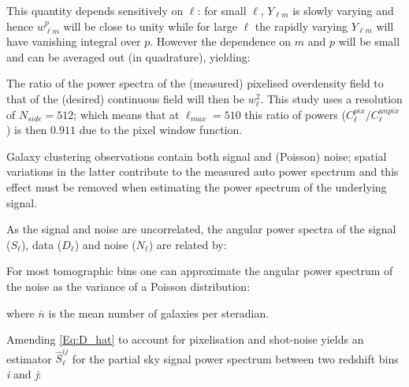 
\noindent This quantity depends sensitively on $\ell$: for small $\ell$, $Y_{\ell m}$ is slowly varying and hence $w_{\ell m}^p$ will be close to unity while for large $\ell$ the rapidly varying $Y_{\ell m}$ will have vanishing integral over $p$. However the dependence on $m$ and $p$ will be small and can be averaged out (in quadrature), yielding:


\noindent The ratio of the power spectra of the (measured) pixelised overdensity field to that of the (desired) continuous field will then be $w_{\ell}^2$. This study uses a \healpix resolution of $N_{side} = 512$; which means that at $\ell_{max} = 510$ this ratio of powers ($C_{\ell}^{pix}/C_{\ell}^{unpix}$) is then $0.911$ due to the pixel window function.

\qquad Galaxy clustering observations contain both signal and (Poisson) noise; spatial variations in the latter contribute to the measured auto power spectrum and this effect must be removed when estimating the power spectrum of the underlying signal. 

\qquad As the signal and noise are uncorrelated, the angular power spectra of the signal ($S_{\ell}$), data ($D_{\ell}$) and noise ($N_{\ell}$) are related by:


\qquad For most tomographic bins one can approximate the angular power spectrum of the noise as the variance of a Poisson distribution:


\noindent where $\bar{n}$ is the mean number of galaxies per steradian.

\qquad Amending \eqref{Eq:D_hat} to account for pixelisation and shot-noise yields an estimator $\hat{S}^{ij}_{\ell}$ for the partial sky signal power spectrum between two redshift bins \textit{i} and \textit{j}:



